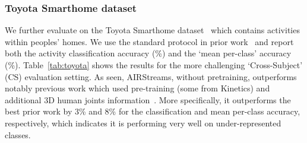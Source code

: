 \documentclass[final]{cvpr}
\begin{document}
\begin{table} []
\begin{center}
\caption{Classification and mean per-class accuracies on Toyota Smarthome. The pose column indicates whether the precomputed pose was used and the pretraining column indicates whether pretraining on another video dataset was used. AIRStreams \textbf{does not use pre-training}. Some prior methods are reported by~\cite{das2019toyota}.}
\label{tab:toyota}
\vspace{-8mm}
\end{center}
\end{table}

\vspace{-3mm}
\subsubsection{Toyota Smarthome dataset}
\label{sec:toyota}
We further evaluate on the Toyota Smarthome dataset~\cite{das2019toyota} which contains activities within peoples' homes. We use the standard protocol in prior work~\cite{das2019toyota} and report both the activity classification accuracy (\%) and the `mean per-class' accuracy (\%). Table~\ref{tab:toyota} shows the results for the more challenging `Cross-Subject' (CS) evaluation setting.
As seen, AIRStreams, without pretraining, outperforms notably previous work which used pre-training (some from Kinetics) and additional 3D human joints information~\cite{das2019toyota}. More specifically, it outperforms the best prior work by 3\% and 8\% for the classification and mean per-class accuracy, respectively, which indicates it is performing very well on under-represented classes.
\end{document}

